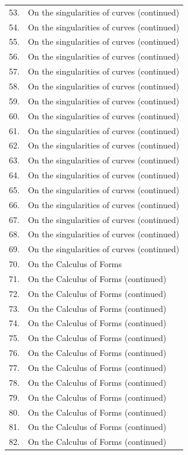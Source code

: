 \documentclass[11pt,a4paper]{article}
\begin{document}
\begin{longtable}{rp{}}
53. & On the singularities of curves (continued) \\
54. & On the singularities of curves (continued) \\
55. & On the singularities of curves (continued) \\
56. & On the singularities of curves (continued) \\
57. & On the singularities of curves (continued) \\
58. & On the singularities of curves (continued) \\
59. & On the singularities of curves (continued) \\
60. & On the singularities of curves (continued) \\
61. & On the singularities of curves (continued) \\
62. & On the singularities of curves (continued) \\
63. & On the singularities of curves (continued) \\
64. & On the singularities of curves (continued) \\
65. & On the singularities of curves (continued) \\
66. & On the singularities of curves (continued) \\
67. & On the singularities of curves (continued) \\
68. & On the singularities of curves (continued) \\
69. & On the singularities of curves (continued) \\
70. & On the Calculus of Forms \\
71. & On the Calculus of Forms (continued) \\
72. & On the Calculus of Forms (continued) \\
73. & On the Calculus of Forms (continued) \\
74. & On the Calculus of Forms (continued) \\
75. & On the Calculus of Forms (continued) \\
76. & On the Calculus of Forms (continued) \\
77. & On the Calculus of Forms (continued) \\
78. & On the Calculus of Forms (continued) \\
79. & On the Calculus of Forms (continued) \\
80. & On the Calculus of Forms (continued) \\
81. & On the Calculus of Forms (continued) \\
82. & On the Calculus of Forms (continued) \\

\end{longtable}
\end{document}

